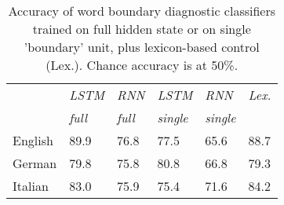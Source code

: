

\begin{table}[t]
	\small
  \begin{center}
    \begin{tabular}{l|l|l|l|l||l}
      \multicolumn{1}{c|}{}&\emph{LSTM}&\emph{RNN}&\emph{LSTM}&\emph{RNN}&\emph{Lex.}\\
            \multicolumn{1}{c|}{}&\emph{full}&\emph{full}&\emph{single}&\emph{single}&\\
      \hline
      English & 89.9 &  76.8  & 77.5 & 65.6&  88.7   \\ 
      German & 79.8  &  75.8  & 80.8 & 66.8& 79.3  \\ 
      Italian &  83.0 &  75.9 & 75.4 & 71.6&  84.2   \\ 
    \end{tabular}
  \end{center}
  \caption{\label{tab:segmentation-results} Accuracy of word boundary diagnostic classifiers trained on full hidden state or on single 'boundary' unit, plus lexicon-based control (Lex.). Chance accuracy is at 50\%.}
\end{table}



